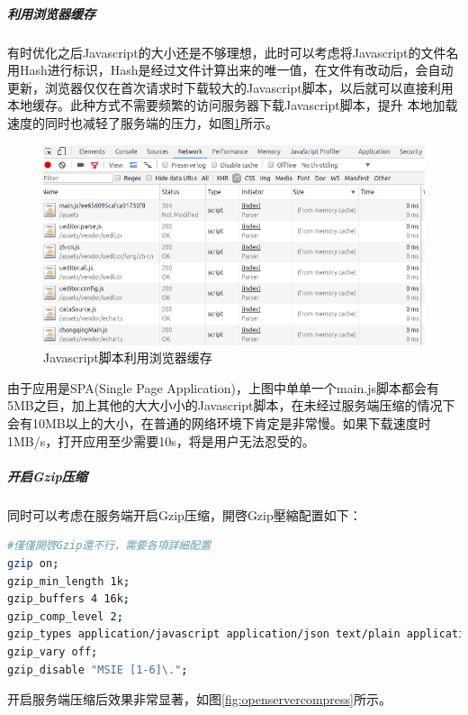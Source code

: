 \documentclass[letter]{book}
\begin{document}
\subparagraph{利用浏览器缓存}

有时优化之后Javascript的大小还是不够理想，此时可以考虑将Javascript的文件名用Hash进行标识，Hash是经过文件计算出来的唯一值，在文件有改动后，会自动更新，浏览器仅仅在首次请求时下载较大的Javascript脚本，以后就可以直接利用本地缓存。此种方式不需要频繁的访问服务器下载Javascript脚本，提升 本地加载速度的同时也减轻了服务端的压力，如图\ref{fig:scriptusingdiskcache}所示。

\begin{figure}[htbp]
	\centering
	\includegraphics[scale=0.45]{scriptusingdiskcache.png}
	\caption{Javascript脚本利用浏览器缓存}
	\label{fig:scriptusingdiskcache}
\end{figure}

由于应用是SPA(Single Page Application)，上图中单单一个main.js脚本都会有5MB之巨，加上其他的大大小小的Javascript脚本，在未经过服务端压缩的情况下会有10MB以上的大小，在普通的网络环境下肯定是非常慢。如果下载速度时1MB/s，打开应用至少需要10s，将是用户无法忍受的。

\subparagraph{开启Gzip压缩}

同时可以考虑在服务端开启Gzip压缩，開啓Gzip壓縮配置如下：

\begin{lstlisting}[language=Bash]
#僅僅開啓Gzip還不行，需要各項詳細配置
gzip on;
gzip_min_length 1k;
gzip_buffers 4 16k;
gzip_comp_level 2;
gzip_types application/javascript application/json text/plain application/x-javascript text/css application/xml text/javascript application/x-httpd-php image/jpeg image/gif image/png;
gzip_vary off;
gzip_disable "MSIE [1-6]\.";
\end{lstlisting}

开启服务端压缩后效果非常显著，如图\ref{fig:openservercompress}所示。
\end{document}
